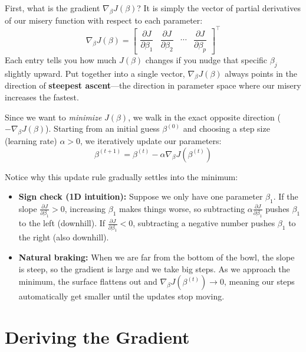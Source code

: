 \documentclass[12pt]{article}
\begin{document}
First, what is the gradient $\nabla_\beta J(\beta)$? It is simply the vector of
partial derivatives of our misery function with respect to each parameter:
\begin{equation}
    \nabla_\beta J(\beta) =
    \begin{bmatrix}
        \dfrac{\partial J}{\partial \beta_1} &
        \dfrac{\partial J}{\partial \beta_2} &
        \cdots &
        \dfrac{\partial J}{\partial \beta_p}
    \end{bmatrix}^\top
\end{equation}
Each entry tells you how much $J(\beta)$ changes if you nudge that specific
$\beta_j$ slightly upward. Put together into a single vector,
$\nabla_\beta J(\beta)$ always points in the direction of \textbf{steepest
ascent}---the direction in parameter space where our misery increases the
fastest.

Since we want to \emph{minimize} $J(\beta)$, we walk in the exact opposite
direction ($-\nabla_\beta J(\beta)$). Starting from an initial guess
$\beta^{(0)}$ and choosing a step size (learning rate) $\alpha > 0$, we
iteratively update our parameters:
\begin{equation}
    \beta^{(t+1)} = \beta^{(t)} - \alpha \nabla_\beta J(\beta^{(t)})
\end{equation}

Notice why this update rule gradually settles into the minimum:
\begin{itemize}
    \item \textbf{Sign check (1D intuition):} Suppose we only have one
    parameter $\beta_1$. If the slope $\frac{\partial J}{\partial \beta_1} > 0$,
    increasing $\beta_1$ makes things worse, so subtracting
    $\alpha \frac{\partial J}{\partial \beta_1}$ pushes $\beta_1$ to the left
    (downhill). If $\frac{\partial J}{\partial \beta_1} < 0$, subtracting a
    negative number pushes $\beta_1$ to the right (also downhill).
    \item \textbf{Natural braking:} When we are far from the bottom of the
    bowl, the slope is steep, so the gradient is large and we take big steps.
    As we approach the minimum, the surface flattens out and
    $\nabla_\beta J(\beta^{(t)}) \to 0$, meaning our steps automatically get
    smaller until the updates stop moving.
\end{itemize}

\section{Deriving the Gradient}
\end{document}
